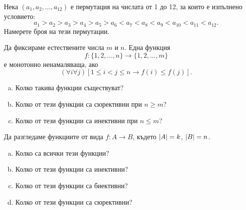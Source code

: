 \begin{problem}
  Нека $(a_1,a_2,\dots,a_{12})$ е пермутация на числата от 1 до 12, за които е изпълнено условието:
  \[a_1 > a_2 > a_3 > a_4 > a_5 > a_6 < a_7 < a_8 < a_9 < a_{10} < a_{11} < a_{12}.\]
  Намерете броя на тези пермутации.  
\end{problem}

\begin{problem}
  Да фиксираме естествените числа $m$ и $n$.
  Една функция \[f:\{1,2,\dots,n\}\to\{1,2,\dots,m\}\] е монотонно ненамаляваща, ако
  \[(\forall i\forall j)[1\leq i<j\leq n \rightarrow f(i)\leq f(j)].\]
  \begin{enumerate}[a)]
  \item
    Колко такива функции съществуват?
  \item
    Колко от тези функции са сюрективни при $n\geq m$?
  \item
    Колко от тези функции са инективни при $n\leq m$?
  \end{enumerate}
\end{problem}

\begin{problem}
  Да разгледаме функциите от вида $f:A\to B$,
  където $\lvert{A}\rvert = k$, $\lvert{B}\rvert = n$.
  \begin{enumerate}[a)]
  \item 
    Колко са всички тези функции?
  \item
    Колко от тези функции са инективни?
  \item
    Колко от тези функции са биективни?
  \item
    Колко от тези функции са сюрективни?
  \end{enumerate}
\end{problem}


